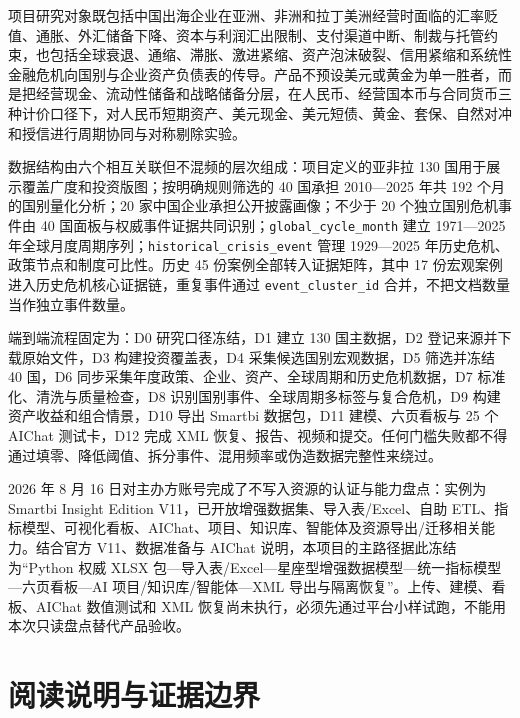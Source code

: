 \documentclass[UTF8,fontset=windows,12pt,openany]{ctexbook}
\newcommand{\Field}[1]{{\small\nolinkurl{#1}}}
\begin{document}
项目研究对象既包括中国出海企业在亚洲、非洲和拉丁美洲经营时面临的汇率贬值、通胀、外汇储备下降、资本与利润汇出限制、支付渠道中断、制裁与托管约束，也包括全球衰退、通缩、滞胀、激进紧缩、资产泡沫破裂、信用紧缩和系统性金融危机向国别与企业资产负债表的传导。产品不预设美元或黄金为单一胜者，而是把经营现金、流动性储备和战略储备分层，在人民币、经营国本币与合同货币三种计价口径下，对人民币短期资产、美元现金、美元短债、黄金、套保、自然对冲和授信进行周期协同与对称剔除实验。

数据结构由六个相互关联但不混频的层次组成：项目定义的亚非拉 130 国用于展示覆盖广度和投资版图；按明确规则筛选的 40 国承担 2010—2025 年共 192 个月的国别量化分析；20 家中国企业承担公开披露画像；不少于 20 个独立国别危机事件由 40 国面板与权威事件证据共同识别；\Field{global_cycle_month} 建立 1971—2025 年全球月度周期序列；\Field{historical_crisis_event} 管理 1929—2025 年历史危机、政策节点和制度可比性。历史 45 份案例全部转入证据矩阵，其中 17 份宏观案例进入历史危机核心证据链，重复事件通过 \Field{event_cluster_id} 合并，不把文档数量当作独立事件数量。

端到端流程固定为：D0 研究口径冻结，D1 建立 130 国主数据，D2 登记来源并下载原始文件，D3 构建投资覆盖表，D4 采集候选国别宏观数据，D5 筛选并冻结 40 国，D6 同步采集年度政策、企业、资产、全球周期和历史危机数据，D7 标准化、清洗与质量检查，D8 识别国别事件、全球周期多标签与复合危机，D9 构建资产收益和组合情景，D10 导出 Smartbi 数据包，D11 建模、六页看板与 25 个 AIChat 测试卡，D12 完成 XML 恢复、报告、视频和提交。任何门槛失败都不得通过填零、降低阈值、拆分事件、混用频率或伪造数据完整性来绕过。

2026 年 8 月 16 日对主办方账号完成了不写入资源的认证与能力盘点：实例为 Smartbi Insight Edition V11，已开放增强数据集、导入表/Excel、自助 ETL、指标模型、可视化看板、AIChat、项目、知识库、智能体及资源导出/迁移相关能力。结合官方 V11、数据准备与 AIChat 说明\cite{smartbiversion,smartbiprepare,smartbiaichat}，本项目的主路径据此冻结为“Python 权威 XLSX 包—导入表/Excel—星座型增强数据模型—统一指标模型—六页看板—AI 项目/知识库/智能体—XML 导出与隔离恢复”。上传、建模、看板、AIChat 数值测试和 XML 恢复尚未执行，必须先通过平台小样试跑，不能用本次只读盘点替代产品验收。

\chapter*{阅读说明与证据边界}
\end{document}
